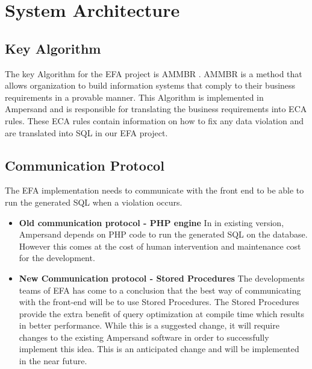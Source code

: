 \documentclass[12pt, svgnames]{article}
\begin{document}

\newpage
\section{System Architecture} \label{SystemArch}

\subsection{Key Algorithm}
The key Algorithm for the EFA project is AMMBR \cite{AMMBR}. AMMBR is a method that allows organization to build information systems that comply to their business requirements in a provable manner. This Algorithm is implemented in Ampersand and is responsible for translating the business requirements into ECA rules. These ECA rules contain information on how to fix any data violation and are translated into SQL in our EFA project.

\subsection{Communication Protocol}
The EFA implementation needs to communicate with the front end to be able to run the generated SQL when a violation occurs. 
	\begin{itemize}
		\item \textbf{Old communication protocol -  PHP engine} \newline
			In in existing version, Ampersand depends on PHP code to run the generated SQL on the database. However this comes at the cost of human intervention and maintenance cost for the development. 
		\item \textbf{New Communication protocol - Stored Procedures} \newline
			The developments teams of EFA has come to a conclusion that the best way of communicating with the front-end will be to use Stored Procedures\cite{SP}. The Stored Procedures provide the extra benefit of query optimization at compile time which results in better performance. While this is a suggested change, it will require changes to the existing Ampersand software in order to successfully implement this idea. This is an anticipated change and will be implemented in the near future.
			
	\end{itemize}
\end{document}
